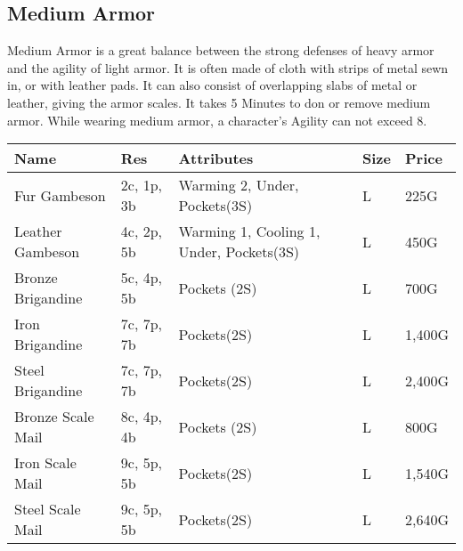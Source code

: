 \subsection{Medium Armor}\label{subsec:mediumArmor}
Medium Armor is a great balance between the strong defenses of heavy armor and the agility of light armor.
It is often made of cloth with strips of metal sewn in, or with leather pads.
It can also consist of overlapping slabs of metal or leather, giving the armor scales.
It takes 5 Minutes to don or remove medium armor.
While wearing medium armor, a character's Agility can not exceed 8.

\begin{longtable}{p{3.5cm} | p{1.5cm} | p{5cm} | p{1cm} | p{1.25cm}}
	Name & Res & Attributes & Size & Price\\ \hline
	Fur Gambeson & 2c, 1p, 3b & Warming 2, Under, Pockets(3S) & L & 225G\\
	
	Leather Gambeson & 4c, 2p, 5b & Warming 1, Cooling 1, Under, Pockets(3S) & L & 450G\\

	Bronze Brigandine & 5c, 4p, 5b & Pockets (2S) & L & 700G\\

	Iron Brigandine & 7c, 7p, 7b & Pockets(2S) & L & 1,400G\\
	
	Steel Brigandine & 7c, 7p, 7b & Pockets(2S) & L & 2,400G\\

	Bronze Scale Mail & 8c, 4p, 4b & Pockets (2S) & L & 800G\\

	Iron Scale Mail & 9c, 5p, 5b & Pockets(2S) & L & 1,540G\\
	
	Steel Scale Mail & 9c, 5p, 5b & Pockets(2S) & L & 2,640G\\
\end{longtable}